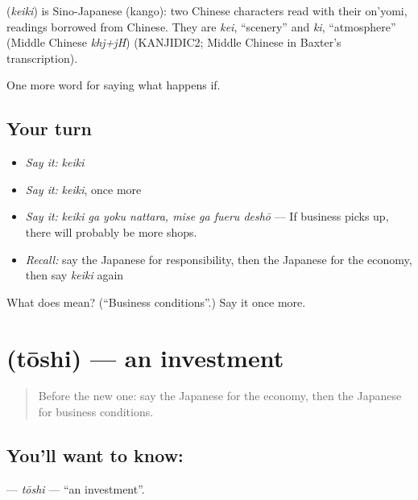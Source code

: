 \begin{cousinweb}
\textbf{} (\emph{keiki}) is Sino-Japanese (kango): two Chinese characters read with their on'yomi, readings borrowed from Chinese. They are \emph{kei}, \textquotedblleft{}scenery\textquotedblright{} and \emph{ki}, \textquotedblleft{}atmosphere\textquotedblright{} (Middle Chinese \emph{khj+jH}) (KANJIDIC2; Middle Chinese in Baxter's transcription).
\end{cousinweb}

\begin{grammarlens}[title={What you've built}]
One more word for saying what happens if.
\end{grammarlens}

\subsection*{Your turn}
\begin{itemize}
\raggedright
  \item \emph{Say it:} \emph{keiki}
  \item \emph{Say it:} \emph{keiki}, once more
  \item \emph{Say it:} \emph{keiki ga yoku nattara, mise ga fueru deshō} — If business picks up, there will probably be more shops.
  \item \emph{Recall:} say the Japanese for responsibility, then the Japanese for the economy, then say \emph{keiki} again
\end{itemize}

\begin{tcolorbox}[breakable,colback=teal!4,colframe=teal!35!black,title={Before you move on}]
What does  mean? (\textquotedblleft{}Business conditions\textquotedblright{}.) Say it once more.
\end{tcolorbox}
\section[\texorpdfstring{\ja{とうし} (tōshi)}{とうし (tōshi)}]{ (tōshi) — an investment}

\label{lesson:JA-C365-toushi}



\begin{quote}
Before the new one: say the Japanese for the economy, then the Japanese for business conditions.
\end{quote}

\subsection*{You'll want to know: }
\textbf{} — \emph{tōshi} — \textquotedblleft{}an investment\textquotedblright{}.

